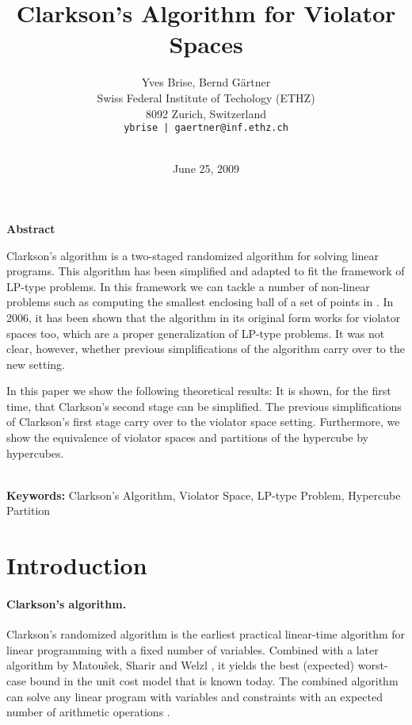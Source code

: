 \documentclass[12pt]{article}
\theoremstyle{remark}
\begin{document}
\date{June 25, 2009}
\title{Clarkson's Algorithm for Violator Spaces}
\author{Yves Brise, Bernd G\"artner\\
{\small Swiss Federal Institute of Techology (ETHZ)}\\{\small 8092 Zurich, Switzerland}\\{\small 
\texttt{ybrise | gaertner@inf.ethz.ch}}\\\\
}

\maketitle
\begin{center}
	\textbf{Abstract}\\
\end{center}
Clarkson's algorithm is a two-staged randomized algorithm for solving linear programs. 
This algorithm has been simplified and adapted to fit the framework of LP-type problems. In this
framework we can tackle a number of non-linear problems such as computing the smallest
enclosing ball of a set of points in .
In 2006, it has been shown that the algorithm in its original form works for violator spaces too, which 
are a proper
generalization of LP-type problems. It was not clear, however, whether previous simplifications of the 
algorithm carry over to the new setting.


In this paper we show the following theoretical results:  It is shown, for the first time, that Clarkson's
second stage can be simplified.   The previous simplifications of Clarkson's first stage carry
over to the violator space setting.  
 Furthermore, we show the equivalence of violator spaces and partitions of the hypercube by hypercubes.

~\\
\textbf{Keywords:} Clarkson's Algorithm, Violator Space, LP-type Problem, Hypercube Partition



\section{Introduction}
\paragraph{Clarkson's algorithm.}
Clarkson's randomized algorithm \cite{c-lvali-95} is the earliest
practical linear-time algorithm for linear programming with a fixed
number of variables.  Combined with a later algorithm by Matou{\v{s}}ek,
Sharir and Welzl \cite{MSW}, it yields the best (expected) worst-case
bound in the unit cost model that is known today.  The combined
algorithm can solve any linear program with  variables and 
constraints with an expected number of  arithmetic operations \cite{GaerWel1}.
\end{document}
